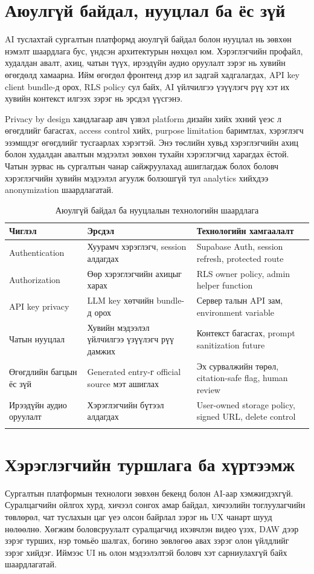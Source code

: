\section{Аюулгүй байдал, нууцлал ба ёс зүй}
AI туслахтай сургалтын платформд аюулгүй байдал болон нууцлал нь зөвхөн нэмэлт шаардлага бус, үндсэн архитектурын нөхцөл юм. Хэрэглэгчийн профайл, худалдан авалт, ахиц, чатын түүх, ирээдүйн аудио оруулалт зэрэг нь хувийн өгөгдөлд хамаарна. Ийм өгөгдөл фронтенд дээр ил задгай хадгалагдах, API key client bundle-д орох, RLS policy сул байх, AI үйлчилгээ үзүүлэгч рүү хэт их хувийн контекст илгээх зэрэг нь эрсдэл үүсгэнэ.

Privacy by design хандлагаар авч үзвэл platform дизайн хийх эхний үеэс л өгөгдлийг багасгах, access control хийх, purpose limitation баримтлах, хэрэглэгч эзэмшдэг өгөгдлийг тусгаарлах хэрэгтэй. Энэ төслийн хувьд хэрэглэгчийн ахиц болон худалдан авалтын мэдээлэл зөвхөн тухайн хэрэглэгчид харагдах ёстой. Чатын зурвас нь сургалтын чанар сайжруулахад ашиглагдаж болох боловч хэрэглэгчийн хувийн мэдээлэл агуулж болзошгүй тул analytics хийхдээ anonymization шаардлагатай.

\begin{longtable}{|p{}|p{}|p{}|}
  \hline
  \textbf{Чиглэл} & \textbf{Эрсдэл} & \textbf{Технологийн хамгаалалт} \\ \hline
  Authentication & Хуурамч хэрэглэгч, session алдагдах & Supabase Auth, session refresh, protected route \\ \hline
  Authorization & Өөр хэрэглэгчийн ахицыг харах & RLS owner policy, admin helper function \\ \hline
  API key privacy & LLM key хөтчийн bundle-д орох & Сервер талын API зам, environment variable \\ \hline
  Чатын нууцлал & Хувийн мэдээлэл үйлчилгээ үзүүлэгч рүү дамжих & Контекст багасгах, prompt sanitization future \\ \hline
  Өгөгдлийн багцын ёс зүй & Generated entry-г official source мэт ашиглах & Эх сурвалжийн төрөл, citation-safe flag, human review \\ \hline
  Ирээдүйн аудио оруулалт & Хэрэглэгчийн бүтээл алдагдах & User-owned storage policy, signed URL, delete control \\ \hline
  \caption{Аюулгүй байдал ба нууцлалын технологийн шаардлага}
  \label{tab:security-privacy-tech}
\end{longtable}

\section{Хэрэглэгчийн туршлага ба хүртээмж}
Сургалтын платформын технологи зөвхөн бекенд болон AI-аар хэмжигдэхгүй. Суралцагчийн ойлгох хурд, хичээл сонгох амар байдал, хичээлийн тоглуулагчийн төвлөрөл, чат туслахын цаг үеэ олсон байрлал зэрэг нь UX чанарт шууд нөлөөлнө. Хөгжим боловсруулалт суралцагчид ихэвчлэн видео үзэх, DAW дээр зэрэг турших, нэр томьёо шалгах, богино зөвлөгөө авах зэрэг олон үйлдлийг зэрэг хийдэг. Иймээс UI нь олон мэдээлэлтэй боловч хэт сарниулахгүй байх шаардлагатай.

